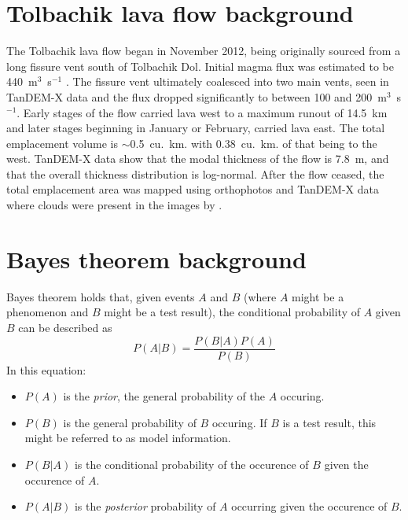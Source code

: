 \documentclass[12pt,letter]{article}
\begin{document}
\section{Tolbachik lava flow background}\label{sec:tolb_back}
The Tolbachik lava flow began in November 2012, being originally sourced from a long fissure vent south of Tolbachik Dol. Initial magma flux was estimated to be 440~m$^3$~s$^{-1}$ \citep{belousov2015overview}. The fissure vent ultimately coalesced into two main vents, seen in TanDEM-X data and the flux dropped significantly to between 100 and 200~m$^3$~s$^{-1}$. Early stages of the flow carried lava west to a maximum runout of 14.5~km and later stages beginning in January or February, carried lava east. The total emplacement volume is $\sim$0.5~cu.~km. with 0.38~cu.~km. of that being to the west. TanDEM-X data show that the modal thickness of the flow is 7.8~m, and that the overall thickness distribution is log-normal. After the flow ceased, the total emplacement area was mapped using orthophotos and TanDEM-X data where clouds were present in the images by \citet{kubanek2015lava}.

\section{Bayes theorem background}\label{sec:bayes_back}
Bayes theorem holds that, given events $A$ and $B$ (where $A$ might be a phenomenon and $B$ might be a test result), the conditional probability of $A$ given $B$ can be described as
\begin{equation}
P(A|B)=\frac{P(B|A)P(A)}{P(B)}\label{eq_bayes}
\end{equation}
In this equation:
\begin{itemize}
	\item $P(A)$ is the \textit{prior}, the general probability of the $A$ occuring.
	\item $P(B)$ is the general probability of $B$ occuring. If $B$ is a test result, this might be referred to as model information.
	\item $P(B|A)$ is the conditional probability of the occurence of $B$ given the occurence of $A$.
	\item $P(A|B)$ is the \textit{posterior} probability of $A$ occurring given the occurence of $B$.
\end{itemize}
\end{document}
